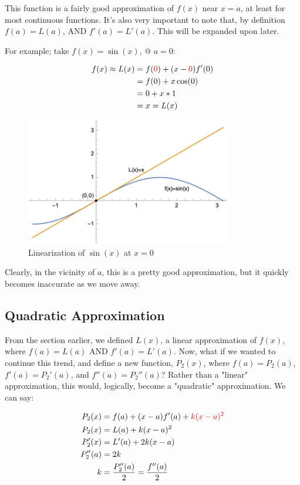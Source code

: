\documentclass[12pt]{article}
\begin{document}
This function is a fairly good approximation of $f(x)$ near $x=a$, at least for most continuous functions. It's also very important to note that, by definition $f(a) = L(a)$, AND $f'(a) = L'(a)$. This will be expanded upon later.

For example; take $f(x) = \sin(x)$, @ $a=0$:

\begin{equation}
    \begin{split}
        f(x) \approx L(x) &= f(\textcolor{red}{0}) + (x-\textcolor{red}{0})f'(0)\\
        &= f(0) + x\cos(0)\\
        &= 0 + x*1\\
        &= x = L(x)
    \end{split}
\end{equation}

\begin{figure}
    \centering
    \includegraphics[width=9cm]{misc/linearizationofsinx.png}
    \caption{Linearization of $\sin(x)$ at $x=0$}
\end{figure}

Clearly, in the vicinity of $a$, this is a pretty good approximation, but it quickly becomes inaccurate as we move away.

\subsection{Quadratic Approximation}
From the section earlier, we defined $L(x)$, a linear approximation of $f(x)$, where $f(a) = L(a)$ AND $f'(a) = L'(a)$. Now, what if we wanted to continue this trend, and define a new function, $P_2(x)$, where $f(a) = P_2(a)$, $f'(a) = P_2'(a)$, and $f''(a) = P_2''(a)$? Rather than a "linear" approximation, this would, logically, become a "quadratic" approximation. We can say:

\begin{equation}
    \begin{split}
    P_2(x) &= f(a) + (x-a)f'(a) + \textcolor{red}{k(x-a)^2}\\
    P_2(x) &= L(a) + k(x-a)^2\\
    P_2'(x) &= L'(a) + 2k(x-a)\\
    P_2''(a) &= 2k\\
    k &= \frac{P_2''(a)}{2} = \frac{f''(a)}{2}
    \end{split}
\end{equation}
\end{document}
